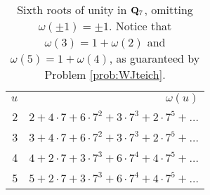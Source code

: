 {\setlength{\tabcolsep}{16pt}
\begin{table}[b]
    \centering
        
    \label{tab:my_label}
    \begin{tabular}{rr}\toprule

    \multicolumn{1}{r}{$u$} & \multicolumn{1}{r}{$\omega(u)$}\\ \cmidrule(lr){1-1}\cmidrule(lr){2-2}          2&  $2 + 4\cdot7 + 6\cdot7^2 + 3\cdot7^3 + 2\cdot7^5+\dots$\\
          3&  $3 + 4\cdot7 + 6\cdot7^2 + 3\cdot7^3 + 2\cdot7^5+\dots$ \\
          4& $4 + 2\cdot7 + 3\cdot7^3 + 6\cdot7^4 + 4\cdot7^5+\dots$\\
          5& $5 + 2\cdot7 + 3\cdot7^3 + 6\cdot7^4 + 4\cdot7^5+\dots$\\\bottomrule
        
    \end{tabular}
\caption*{Sixth roots of unity in $\mathbf{Q}_7$, omitting $\omega(\pm 1)=\pm 1$. Notice that $\omega(3)=1+\omega(2)$ and $\omega(5) = 1+\omega(4)$, as guaranteed by Problem \ref{prob:WJteich}.}
\end{table}}
